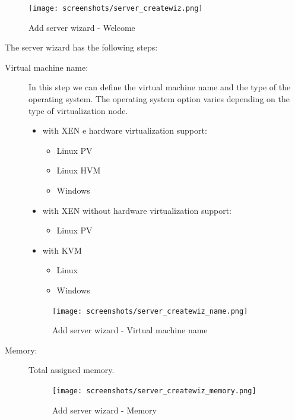 \begin{figure}[H]
	\begin{center}
	\texttt{[image: screenshots/server\_createwiz.png]}
	\caption{Add server wizard - Welcome}
	\label{fig:server_createwiz}
	\end{center}
\end{figure}
The server wizard has the following steps:
\begin{description}
	\item[Virtual machine name:] In this step we can define the virtual machine name and the type of the operating system. The operating system option varies depending on the type of virtualization node.
		\begin{itemize}
			\item with XEN e hardware virtualization support:
			\begin{itemize}
				\item Linux PV
				\item Linux HVM
				\item Windows
			\end{itemize}
 			\item with XEN without hardware virtualization support:
			\begin{itemize}
				\item Linux PV
			\end{itemize}
 			\item with KVM
			\begin{itemize}
				\item Linux
				\item Windows
			\end{itemize}
		\end{itemize}
	
		\begin{figure}[H]
        		\begin{center}
		        \texttt{[image: screenshots/server\_createwiz\_name.png]}
        		\caption{Add server wizard - Virtual machine name}
	        	\label{fig:server_createwiz_name}
	        	\end{center}
		\end{figure}
 
	\item[Memory:] Total assigned memory.
		\begin{figure}[H]
        		\begin{center}
		        \texttt{[image: screenshots/server\_createwiz\_memory.png]}
        		\caption{Add server wizard - Memory}
	        	\label{fig:server_createwiz_memory}
	        	\end{center}
		\end{figure}


\end{description}
